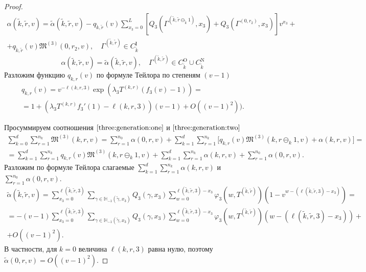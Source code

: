 \documentclass[a4paper,12pt,russian]{extarticle}
\begin{document}
\begin{proof}
\begin{multline}
\alpha(\tilde{k},\tilde{r},v) =\tilde{\alpha}(\tilde{k},\tilde{r},v) - q_{\tilde{k},\tilde{r}}(v)\sum_{x_3=0}^{L} \left[ Q_3(\Gamma^{(\tilde{k},\tilde{r}\ominus_{\tilde{k}} 1)},x_3) + Q_3(\Gamma^{(0,r_2)},x_3) \right] v^{x_3}+ \\ 
+ q_{\tilde{k},\tilde{r}}(v)  \mathfrak{M}^{(3)}(0,r_2,v), \quad \Gamma^{(\tilde{k}, \tilde{r})} \in C_{\tilde{k}}^{\mathrm{I}}
\end{multline}
\begin{equation}
\alpha(\tilde{k},\tilde{r},v) =\tilde{\alpha}(\tilde{k},\tilde{r},v), \quad \Gamma^{(\tilde{k}, \tilde{r})} \in C_{\tilde{k}}^{\mathrm{O}} \cup C_{\tilde{k}}^{\mathrm{N}}
\end{equation}
Разложим функцию $q_{k,r}(v)$ по формуле Тейлора по степеням $(v-1)$
\begin{multline*}
    q_{k,r}(v) =  v^{-\ell(k,r,3)} \exp{(\lambda_3 T^{(k,r)} (f_3(v)-1))}= \\=1 + (\lambda_3 T^{(k,r)} f_3'(1) - \ell(k,r,3))(v-1) + O((v-1)^2)).
\end{multline*}

Просуммируем соотношения $\eqref{three:generation:one}$ и $\eqref{three:generation:two}$
\begin{multline}
 \sum_{k=0}^{d} \sum_{r=1}^{n_k} \mathfrak{M}^{(3)}(k,r,v) = \sum_{r=1}^{n_0} \alpha (0,r,v) + \sum_{k=1}^{d}\sum_{r=1}^{n_k} \bigl[ q_{k,r}(v) \mathfrak{M}^{(3)}(k,r\ominus_k 1,v) + \alpha(k,r,v)\bigr] = \\
 = \sum_{k=1}^{d}\sum_{r=1}^{n_k} q_{k,r}(v) \mathfrak{M}^{(3)}(k,r\ominus_k 1,v)   + \sum_{k=1}^{d}\sum_{r=1}^{n_k} \alpha(k,r,v)  + \sum_{r=1}^{n_0} \alpha (0,r,v).
 \label{summed:neccessary}
\end{multline}
Разложим по формуле Тейлора слагаемые $\sum_{k=1}^{d}\sum_{r=1}^{n_k} \alpha(k,r,v)$ и $\sum_{r=1}^{n_0} \alpha (0,r,v)$.
\begin{multline*}
    \tilde{\alpha} (\tilde{k},\tilde{r},v) = \sum_{x_3=0}^{\ell(\tilde{k},\tilde{r},3)}\sum_{\gamma \in {\mathbb H}_{-1}(\tilde{\gamma},x_3)} Q_3(\gamma,x_3) \sum_{w=0}^{\ell(\tilde{k},\tilde{r},3) - x_3} \varphi_3(w,T^{(\tilde{k},\tilde{r})}) (1-v^{w-(\ell(\tilde{k},\tilde{r},3)-x_3)})=\\= - (v-1) \sum_{x_3=0}^{\ell(\tilde{k},\tilde{r},3)}\sum_{\gamma \in {\mathbb H}_{-1}(\tilde{\gamma},x_3)} Q_3(\gamma,x_3) \sum_{w=0}^{\ell(\tilde{k},\tilde{r},3) - x_3} \varphi_3(w,T^{(\tilde{k},\tilde{r})}) (w-(\ell(\tilde{k},\tilde{r},3)-x_3)) + \\ + O((v-1)^2).
\end{multline*}
В частности, для $k=0$ величина $\ell(k,r,3)$ равна нулю, поэтому $\tilde{\alpha} (0,r,v) = O((v-1)^2)$.


\end{proof}
\end{document}
